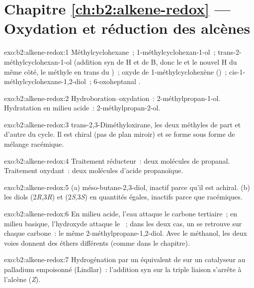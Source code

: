 \section*{Chapitre \ref{ch:b2:alkene-redox} --- Oxydation et réduction des alcènes}

\begin{solution}{exo:b2:alkene-redox:1}
Méthylcyclohexane~; 1-méthylcyclohexan-1-ol~; trans-2-méthylcyclohexan-1-ol (addition syn de
H et de B, donc le  et le nouvel H du même côté, le méthyle en trans du )~;
oxyde de 1-méthylcyclohexène ()~; cis-1-méthylcyclohexane-1,2-diol~; 6-oxoheptanal
.
\end{solution}

\begin{solution}{exo:b2:alkene-redox:2}
Hydroboration--oxydation~: 2-méthylpropan-1-ol. Hydratation en milieu acide~:
2-méthylpropan-2-ol.
\end{solution}

\begin{solution}{exo:b2:alkene-redox:3}
trans-2,3-Diméthyloxirane, les deux méthyles de part et d'autre du cycle. Il est chiral (pas
de plan miroir) et se forme sous forme de mélange racémique.
\end{solution}

\begin{solution}{exo:b2:alkene-redox:4}
Traitement réducteur~: deux molécules de propanal. Traitement oxydant~: deux molécules d'acide
propanoïque.
\end{solution}

\begin{solution}{exo:b2:alkene-redox:5}
(a) méso-butane-2,3-diol, inactif parce qu'il est achiral. (b) les diols
(2\textit{R},3\textit{R}) et (2\textit{S},3\textit{S}) en quantités égales, inactifs
parce que racémiques.
\end{solution}

\begin{solution}{exo:b2:alkene-redox:6}
En milieu acide, l'eau attaque le carbone tertiaire~; en milieu basique, l'hydroxyde attaque le ~; dans les deux
cas, un  se retrouve sur chaque carbone~: le même 2-méthylpropane-1,2-diol. Avec le méthanol, les deux
voies donnent des éthers différents (comme dans le chapitre).
\end{solution}

\begin{solution}{exo:b2:alkene-redox:7}
Hydrogénation par un équivalent de  sur un catalyseur au palladium empoisonné
(Lindlar)~: l'addition syn sur la triple liaison s'arrête à l'alcène (\textit{Z}).
\end{solution}

